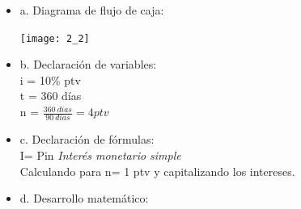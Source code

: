 \begin{itemize}
	\item a. Diagrama de flujo de caja:
	
	\begin{center}
		\texttt{[image: 2\_2]}\\
	\end{center}
	
	\item b. Declaración de variables:\\
	
	i = 10\% ptv\\
	t = 360 días\\
	n = $\frac{360\ dias}{90\ dias} = 4 ptv$ \\
	
	\item c. Declaración de fórmulas:\\
	I= Pin \hspace{35 pt}  \textit{Interés monetario simple}\\
	Calculando para n= 1 ptv y capitalizando los intereses.\\
	
	\item d. Desarrollo matemático:
	

\end{itemize}
